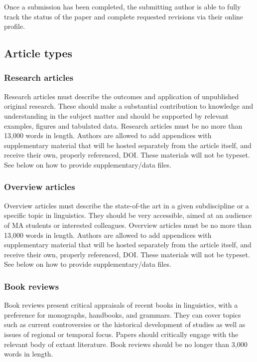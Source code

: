 \documentclass[charis,linguex]{glossa}
\begin{document}
Once a submission has been completed, the submitting author is able to fully track the status of the paper and complete requested revisions via their online profile.

\subsection{Article types}

\subsubsection{Research articles}

Research articles must describe the outcomes and application of unpublished original research. These should make a substantial contribution to knowledge and understanding in the subject matter and should be supported by relevant examples, figures and tabulated data. Research articles must be no more than 13,000 words in length. Authors are allowed to add appendices with supplementary material that will be hosted separately from the article itself, and receive their own, properly referenced, DOI. These materials will not be typeset. See below on how to provide supplementary/data files.

\subsubsection{Overview articles}

Overview articles must describe the state-of-the art in a given subdiscipline or a specific topic in linguistics. They should be very accessible, aimed at an audience of MA students or interested colleagues. Overview articles must be no more than 13,000 words in length. Authors are allowed to add appendices with supplementary material that will be hosted separately from the article itself, and receive their own, properly referenced, DOI. These materials will not be typeset.  See below on how to provide supplementary/data files.

\subsubsection{Book reviews}

Book reviews present critical appraisals of recent books in linguistics, with a preference for monographs, handbooks, and grammars. They can cover topics such as current controversies or the historical development of studies as well as issues of regional or temporal focus. Papers should critically engage with the relevant body of extant literature. Book reviews should be no longer than 3,000 words in length.
\end{document}
